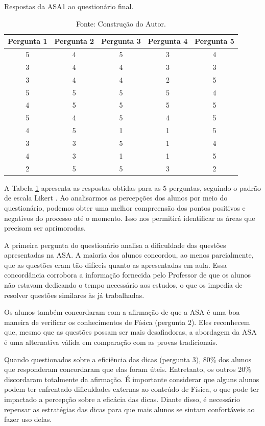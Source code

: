 \begin{table}[ht]
\centering
\caption{Respostas da ASA1 ao questionário final.} \label{tab:questASA1}
\begin{tabular}{ccccc}
\hline
\textbf{Pergunta 1} & \textbf{Pergunta 2} & \textbf{Pergunta 3} & \textbf{Pergunta 4} & \textbf{Pergunta 5} \\ \hline
5 & 4 & 5 & 3 & 4 \\ 
3 & 4 & 4 & 3 & 3 \\ 
3 & 4 & 4 & 2 & 5 \\ 
5 & 5 & 5 & 5 & 4 \\ 
4 & 5 & 5 & 5 & 5 \\ 
5 & 4 & 5 & 4 & 5 \\ 
4 & 5 & 1 & 1 & 5 \\ 
3 & 3 & 5 & 1 & 4 \\ 
4 & 3 & 1 & 1 & 5 \\ 
2 & 5 & 5 & 3 & 2 \\ \hline
\end{tabular}
\caption*{Fonte: Construção do Autor.}
\end{table}

A Tabela \ref{tab:questASA1} apresenta as respostas obtidas para as 5 perguntas, seguindo o padrão de escala Likert \cite{dalmoro}. Ao analisarmos as percepções dos alunos por meio do questionário, podemos obter uma melhor compreensão dos pontos positivos e negativos do processo até o momento. Isso nos permitirá identificar as áreas que precisam ser aprimoradas.

A primeira pergunta do questionário analisa a dificuldade das questões apresentadas na ASA. A maioria dos alunos concordou, ao menos parcialmente, que as questões eram tão difíceis quanto as apresentadas em aula. Essa concordância corrobora a informação fornecida pelo Professor de que os alunos não estavam dedicando o tempo necessário aos estudos, o que os impedia de resolver questões similares às já trabalhadas.

Os alunos também concordaram com a afirmação de que a ASA é uma boa maneira de verificar os conhecimentos de Física (pergunta 2). Eles reconhecem que, mesmo que as questões possam ser mais desafiadoras, a abordagem da ASA é uma alternativa válida em comparação com as provas tradicionais.

Quando questionados sobre a eficiência das dicas (pergunta 3), 80\% dos alunos que responderam concordaram que elas foram úteis. Entretanto, os outros 20\% discordaram totalmente da afirmação. É importante considerar que alguns alunos podem ter enfrentado dificuldades externas ao conteúdo de Física, o que pode ter impactado a percepção sobre a eficácia das dicas. Diante disso, é necessário repensar as estratégias das dicas para que mais alunos se sintam confortáveis ao fazer uso delas.

